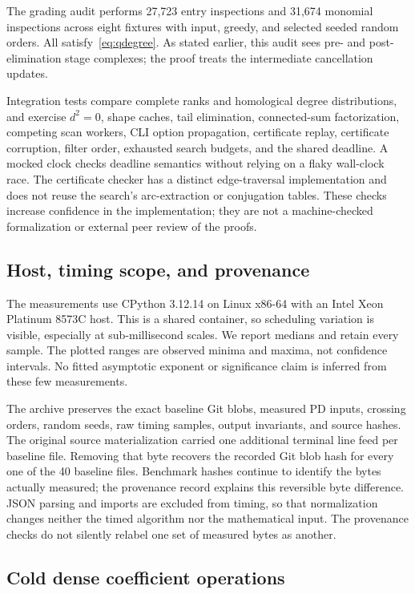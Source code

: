 The grading audit performs 27,723 entry inspections and 31,674 monomial
inspections across eight fixtures with input, greedy, and selected seeded
random orders. All satisfy~\eqref{eq:qdegree}. As stated earlier, this
audit sees pre- and post-elimination stage complexes; the proof treats
the intermediate cancellation updates.

Integration tests compare complete ranks and homological degree
distributions, and exercise $d^2=0$, shape caches, tail elimination,
connected-sum factorization, competing scan workers, CLI option
propagation, certificate replay, certificate corruption, filter order,
exhausted search budgets, and the shared deadline. A mocked clock checks
deadline semantics without relying on a flaky wall-clock race. The
certificate checker has a distinct edge-traversal implementation and does
not reuse the search's arc-extraction or conjugation tables. These checks
increase confidence in the implementation; they are not a machine-checked
formalization or external peer review of the proofs.

\subsection{Host, timing scope, and provenance}

The measurements use CPython 3.12.14 on Linux x86-64 with an Intel Xeon
Platinum 8573C host. This is a shared container, so scheduling variation
is visible, especially at sub-millisecond scales. We report medians and
retain every sample. The plotted ranges are observed minima and maxima,
not confidence intervals. No fitted asymptotic exponent or significance
claim is inferred from these few measurements.

The archive preserves the exact baseline Git blobs, measured PD inputs,
crossing orders, random seeds, raw timing samples, output invariants, and
source hashes. The original source materialization carried one additional
terminal line feed per baseline file. Removing that byte recovers the
recorded Git blob hash for every one of the 40 baseline files. Benchmark
hashes continue to identify the bytes actually measured; the provenance
record explains this reversible byte difference. JSON parsing and imports
are excluded from timing, so that normalization changes neither the timed
algorithm nor the mathematical input. The provenance checks do not
silently relabel one set of measured bytes as another.

\subsection{Cold dense coefficient operations}

